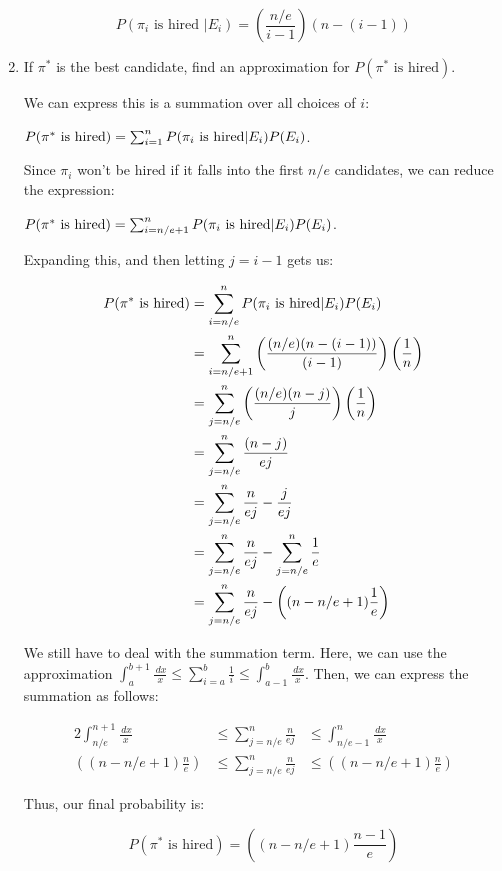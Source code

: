 \documentclass[11pt]{article}
\theoremstyle{definition}
\theoremstyle{case}
\theoremstyle{theorem}
\begin{document}
\begin{enumerate}[label=(\alph*)]
\[
  P(\pi_i \text{ is hired } | E_i) = \left( \frac{n/e}{i-1} \right) (n - (i-1)) 
\]

\item If $\pi^*$ is the best candidate, find an approximation for $P(\pi^* \text{ is hired})$.

We can express this is a summation over all choices of $i$:

$P(\pi^* \text{ is hired}) = \sum_{i=1}^n P(\pi_i \text{ is hired} | E_i) \space P(E_i)$. 

Since $\pi_i$ won't be hired if it falls into the first $n/e$ candidates, we can reduce the expression:

$P(\pi^* \text{ is hired}) = \sum_{i=n/e+1}^n P(\pi_i \text{ is hired} | E_i) \space P(E_i)$. 

Expanding this, and then letting $j = i-1$ gets us:

\begin{align*}
  P(\pi^* \text{ is hired}) &= \sum_{i=n/e}^n P(\pi_i \text{ is hired} | E_i) \space P(E_i) \\
                            &= \sum_{i=n/e+1}^n \left( \frac{(n/e)(n - (i-1))}{(i-1)} \right) \space \left( \frac{1}{n}\right) \\
                            &= \sum_{j=n/e}^n \left( \frac{(n/e)(n - j)}{j} \right) \space \left( \frac{1}{n}\right) \\
                            &= \sum_{j=n/e}^n \frac{(n - j)}{ej} \\
                            &= \sum_{j=n/e}^n \frac{n}{ej} - \frac{j}{ej} \\
                            &= \sum_{j=n/e}^n \frac{n}{ej} - \sum_{j=n/e}^n \frac{1}{e} \\
                            &= \sum_{j=n/e}^n \frac{n}{ej} - \left( (n - n/e + 1) \frac{1}{e} \right) \\
\end{align*}

We still have to deal with the summation term. Here, we can use the approximation $\int_a^{b+1} \frac{\,dx}{x} \leq \sum_{i=a}^b \frac{1}{i} \leq \int_{a-1}^{b} \frac{\,dx}{x}$.
Then, we can express the summation as follows:

\begin{alignat}{2}
 \int_{n/e}^{n+1} \frac{\,dx}{x}          &\leq \sum_{j=n/e}^n \frac{n}{ej} &\leq \int_{n/e-1}^{n} \frac{\,dx}{x} \\
 \left( (n - n/e + 1) \frac{n}{e} \right) &\leq \sum_{j=n/e}^n \frac{n}{ej} &\leq \left( (n - n/e + 1) \frac{n}{e} \right)
\end{alignat}

Thus, our final probability is:

\[
  P(\pi^* \text{ is hired}) = \left( (n - n/e + 1) \frac{n-1}{e} \right)
\]

\end{enumerate}
\end{document}

